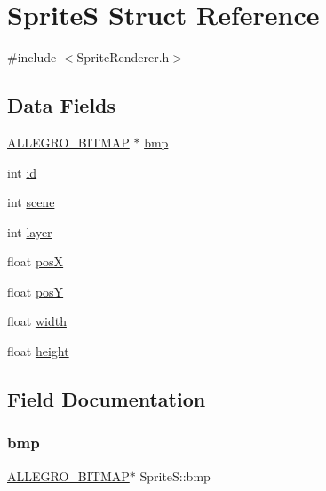 \hypertarget{struct_sprite_s}{}\section{SpriteS Struct Reference}
\label{struct_sprite_s}


{\ttfamily \#include $<$Sprite\+Renderer.\+h$>$}

\subsection*{Data Fields}
\begin{DoxyCompactItemize}
\item 
\hyperlink{bitmap_8h_a97651ee6e8e9e81afb7d8b159591839a}{A\+L\+L\+E\+G\+R\+O\+\_\+\+B\+I\+T\+M\+AP} $\ast$ \hyperlink{struct_sprite_s_a9c707ef49fb484923b756f1d10ef6af9}{bmp}
\item 
int \hyperlink{struct_sprite_s_a345ce1510ab69c0ad8c90fa1ae2bca21}{id}
\item 
int \hyperlink{struct_sprite_s_a5a1923ed70d01fcc045ed1f976e233f5}{scene}
\item 
int \hyperlink{struct_sprite_s_a06ac51d1cad5c0048e2c8af2c6b55371}{layer}
\item 
float \hyperlink{struct_sprite_s_ab5034c60710a5b4d78c0ca5d8df4d010}{posX}
\item 
float \hyperlink{struct_sprite_s_abfecc96372122a47f45b2843d65fa63f}{posY}
\item 
float \hyperlink{struct_sprite_s_a5c2f062d7bfebc2dd3239838aeab4150}{width}
\item 
float \hyperlink{struct_sprite_s_abe7bf9022026c10fe3914e8665e58bab}{height}
\end{DoxyCompactItemize}


\subsection{Field Documentation}
\mbox{\label{struct_sprite_s_a9c707ef49fb484923b756f1d10ef6af9}} 
\subsubsection{\texorpdfstring{bmp}{bmp}}
{\footnotesize\ttfamily \hyperlink{bitmap_8h_a97651ee6e8e9e81afb7d8b159591839a}{A\+L\+L\+E\+G\+R\+O\+\_\+\+B\+I\+T\+M\+AP}$\ast$ Sprite\+S\+::bmp}

